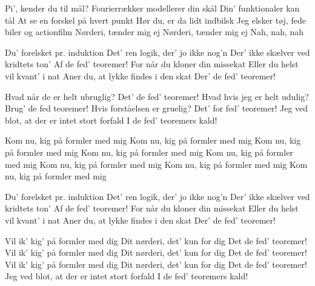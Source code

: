 \documentclass[a4paper,11pt]{article}
\begin{document}
\begin{song}
 Pi', kender du til mål?
   Fourierrækker modellerer din skål
   Din' funktionaler kan tål
   At se en forskel på hvert punkt
 Hør du, er da lidt indbilsk
   Jeg elsker tøj, fede biler og actionfilm
   Nørderi, tænder mig ej
   Nørderi, tænder mig ej 
   Nah, nah, nah
   
 Du' forelsket pr. induktion
   Det' ren logik, der' jo ikke nog'n
   Der' ikke skælver ved kridtets ton'
   Af de fed' teoremer!
   For når du kloner din missekat
   Eller du helst vil kvant' i nat
   Aner du, at lykke findes i den skat
   Der' de fed' teoremer!

 Hvad når de er helt ubruglig?
 Det' de fed' teoremer!
 Hvad hvis jeg er helt udulig?
 Brug' de fed teoremer!
 Hvis forståelsen er gruelig?
 Det' for fed' teoremer!
 Jeg ved blot, at der er intet stort forfald
I de fed' teoremers kald!

 Kom nu, kig på formler med mig
Kom nu, kig på formler med mig
Kom nu, kig på formler med mig
Kom nu, kig på formler med mig
Kom nu, kig på formler med mig
Kom nu, kig på formler med mig
Kom nu, kig på formler med mig
Kom nu, kig på formler med mig

 Du' forelsket pr. induktion
   Det' ren logik, der' jo ikke nog'n
   Der' ikke skælver ved kridtets ton'
   Af de fed' teoremer!
   For når du kloner din missekat
   Eller du helst vil kvant' i nat
   Aner du, at lykke findes i den skat
   Der' de fed' teoremer!

 Vil ik' kig' på formler med dig
Dit nørderi, det' kun for dig
 Det de fed' teoremer!
 Vil ik' kig' på formler med dig
Dit nørderi, det' kun for dig
 Det de fed' teoremer!
 Vil ik' kig' på formler med dig
Dit nørderi, det' kun for dig
 Det de fed' teoremer!
Jeg ved blot, at der er intet stort forfald
I de fed' teoremers kald!

\end{song}
\end{document}
